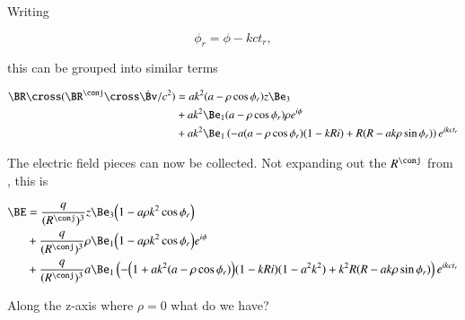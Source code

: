 {Writing

\begin{equation}\label{eqn:relativisticElectrodynamicsExamReflection:640}
\phi_r = \phi - k c t_r,
\end{equation}

this can be grouped into similar terms

\begin{equation}\label{eqn:relativisticElectrodynamicsExamReflection:660}
\begin{aligned}
\BR \cross (\BR^\conj \cross \dot{\Bv}/c^2)
&=
a k^2
(a - \rho \cos\phi_r) z \Be_3 \\
&+
a k^2
\Be_1
(a - \rho \cos\phi_r) \rho e^{i\phi} \\
&+
a k^2
\Be_1
\left(
-a (a - \rho \cos\phi_r) (1 - k R i)
+ R(R - a k \rho \sin \phi_r)
\right) e^{i k c t_r}
\end{aligned}
\end{equation}

The electric field pieces can now be collected.  Not expanding out the \(R^\conj\) from , this is

\begin{equation}\label{eqn:relativisticElectrodynamicsExamReflection:700}
\begin{aligned}
\BE &=
\frac{q}{(R^\conj)^3} z \Be_3
\Bigl( 1 - a \rho k^2 \cos\phi_r \Bigr) \\
&+
\frac{q}{(R^\conj)^3} \rho
\Be_1 \Bigl(1 - a \rho k^2 \cos\phi_r \Bigr) e^{i\phi} \\
&+
\frac{q}{(R^\conj)^3} a \Be_1
\left(
-\Bigl( 1 + a k^2 (a - \rho \cos\phi_r) \Bigr) (1 - k R i)(1 - a^2 k^2)
+ k^2 R(R - a k \rho \sin \phi_r)
\right) e^{i k c t_r}
\end{aligned}
\end{equation}

Along the z-axis where \(\rho = 0\) what do we have?

}

